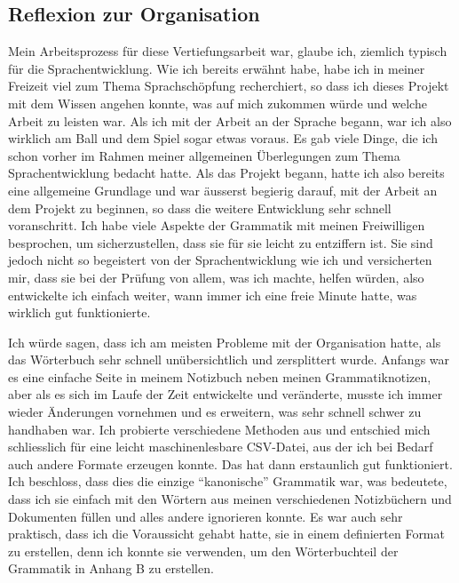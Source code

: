 \documentclass{article}
\begin{document}
\subsection{Reflexion zur Organisation}
Mein Arbeitsprozess für diese Vertiefungsarbeit war, glaube ich, ziemlich typisch für die Sprachentwicklung.
Wie ich bereits erwähnt habe, habe ich in meiner Freizeit viel zum Thema Sprachschöpfung recherchiert,
so dass ich dieses Projekt mit dem Wissen angehen konnte, was auf mich zukommen würde und welche Arbeit zu
leisten war. Als ich mit der Arbeit an der Sprache begann, war ich also wirklich am Ball und dem Spiel sogar
etwas voraus. Es gab viele Dinge, die ich schon vorher im Rahmen meiner allgemeinen Überlegungen zum Thema
Sprachentwicklung bedacht hatte. Als das Projekt begann, hatte ich also bereits eine allgemeine Grundlage
und war äusserst begierig darauf, mit der Arbeit an dem Projekt zu beginnen, so dass die weitere Entwicklung
sehr schnell voranschritt. Ich habe viele Aspekte der Grammatik mit meinen Freiwilligen besprochen,
um sicherzustellen, dass sie für sie leicht zu entziffern ist.
Sie sind jedoch nicht so begeistert von der Sprachentwicklung wie ich und versicherten mir, dass sie bei
der Prüfung von allem, was ich machte, helfen würden, also entwickelte ich einfach weiter, wann immer ich
eine freie Minute hatte, was wirklich gut funktionierte.

Ich würde sagen, dass ich am meisten Probleme mit der Organisation hatte,
als das Wörterbuch sehr schnell unübersichtlich und zersplittert wurde.
Anfangs war es eine einfache Seite in meinem Notizbuch neben meinen Grammatiknotizen,
aber als es sich im Laufe der Zeit entwickelte und veränderte, musste ich immer wieder Änderungen
vornehmen und es erweitern, was sehr schnell schwer zu handhaben war. Ich probierte verschiedene
Methoden aus und entschied mich schliesslich für eine leicht maschinenlesbare CSV-Datei,
aus der ich bei Bedarf auch andere Formate erzeugen konnte. Das hat dann erstaunlich gut funktioniert.
Ich beschloss, dass dies die einzige ``kanonische'' Grammatik war, was bedeutete, dass ich sie einfach mit
den Wörtern aus meinen verschiedenen Notizbüchern und Dokumenten füllen und alles andere ignorieren konnte.
Es war auch sehr praktisch, dass ich die Voraussicht gehabt hatte, sie in einem definierten Format
zu erstellen, denn ich konnte sie verwenden, um den Wörterbuchteil der Grammatik in Anhang B zu erstellen.
\end{document}
